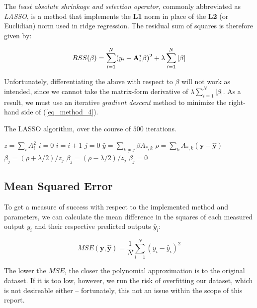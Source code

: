 \documentclass[a4paper,10pt,english]{article}
\begin{document}
	The \textit{least absolute shrinkage and selection operator}, commonly abbreviated as \textit{LASSO}, is a method that implements the \textbf{L1} norm in place of the \textbf{L2} (or Euclidian) norm used in ridge regression.  The residual sum of squares is therefore given by:
	
	\begin{equation}
	\label{eq_method_4}
	RSS(\beta) = \sum_{i=1}^N (y_i - \mathbf{A}_i^\textsc{t} \beta)^2 + \lambda \sum_{i=1}^N |\beta|
	\end{equation}
	
	Unfortunately, differentiating the above with respect to $\beta$ will not work as intended, since we cannot take the matrix-form derivative of $\lambda \sum_{i=1}^N |\beta|$.  As a result, we must use an iterative \textit{gradient descent} method to minimize the right-hand side of (\ref{eq_method_4}).
	
	\begin{algorithm}[H]
		\caption{The LASSO algorithm, over the course of $500$ iterations.}
		\begin{algorithmic}[1]
			\State $z = \sum_i A_i^2$
			\State $i = 0$
				\State $i = i + 1$
				\State $j = 0$
				\While{j < p}
					\State $\hat{y} = \sum_{k \neq j} \beta A_{*,k}$
					\State $\rho = \sum_k A_{*,k} (\mathbf{y} - \mathbf{\hat{y}})$
						\State $\beta_j = (\rho + \lambda/2)/z_j$
						\State $\beta_j = (\rho - \lambda/2)/z_j$
					\Else
						\State $\beta_j = 0$
					\EndIf
				\EndWhile		
			\EndWhile
		\end{algorithmic}
	\end{algorithm}
	
	\subsection*{Mean Squared Error}
	
	To get a measure of success with respect to the implemented method and parameters, we can calculate the mean difference in the squares of each measured output $y_i$ and their respective predicted outputs $\hat{y}_i$:
	
	\begin{equation}
	MSE(\mathbf{y}, \mathbf{\hat{y}}) = \frac{1}{N} \sum_{i=1}^{N} (y_i - \hat{y}_i)^2
	\end{equation}
	
	The lower the $MSE$, the closer the polynomial approximation is to the original dataset.  If it is too low, however, we run the risk of overfitting our dataset, which is not desireable either – fortunately, this not an issue within the scope of this report.
	
\end{document}

